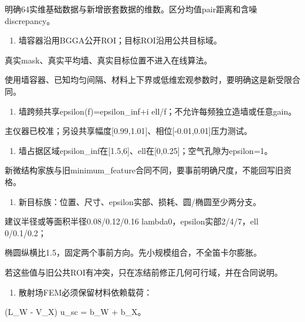\documentclass[
  10pt,
  a4paper,
]{article}
\providecommand{\tightlist}{%
  \setlength{\itemsep}{0pt}\setlength{\parskip}{0pt}}
\providecommand{\tightlist}{\setlength{\itemsep}{1pt}\setlength{\parskip}{1pt}}
\begin{document}
明确64实维基础数据与新增嵌套数据的维数。区分均值pair距离和含噪discrepancy。

\begin{enumerate}
\def\labelenumi{\arabic{enumi}.}
\setcounter{enumi}{3}
\tightlist
\item
  墙容器沿用BGGA公开ROI；目标ROI沿用公共目标域。
\end{enumerate}

真实mask、真实平均墙、真实目标位置不进入在线算法。

使用墙容器、已知均匀间隔、材料上下界或低维宏观参数时，要明确这是新受限合同。

\begin{enumerate}
\def\labelenumi{\arabic{enumi}.}
\setcounter{enumi}{4}
\tightlist
\item
  墙跨频共享epsilon(f)=epsilon\_inf+i
  ell/f；不允许每频独立造墙或任意gain。
\end{enumerate}

主仪器已校准；另设共享幅度{[}0.99,1.01{]}、相位{[}-0.01,0.01{]}压力测试。

\begin{enumerate}
\def\labelenumi{\arabic{enumi}.}
\setcounter{enumi}{5}
\tightlist
\item
  墙占据区域epsilon\_inf在{[}1.5,6{]}、ell在{[}0,0.25{]}；空气孔隙为epsilon=1。
\end{enumerate}

新微结构家族与旧minimum\_feature合同不同，要事前明确尺度，不能回写旧资格。

\begin{enumerate}
\def\labelenumi{\arabic{enumi}.}
\setcounter{enumi}{6}
\tightlist
\item
  新目标族：位置、尺寸、epsilon实部、损耗、圆/椭圆至少两分支。
\end{enumerate}

建议半径或等面积半径0.08/0.12/0.16 lambda0，epsilon实部2/4/7，ell
0/0.1/0.2；

椭圆纵横比1.5，固定两个事前方向。先小规模组合，不全笛卡尔膨胀。

若这些值与旧公共ROI有冲突，只在冻结前修正几何可行域，并在合同说明。

\begin{enumerate}
\def\labelenumi{\arabic{enumi}.}
\setcounter{enumi}{7}
\tightlist
\item
  散射场FEM必须保留材料依赖载荷：
\end{enumerate}

(L\_W - V\_X) u\_sc = b\_W + b\_X。
\end{document}
